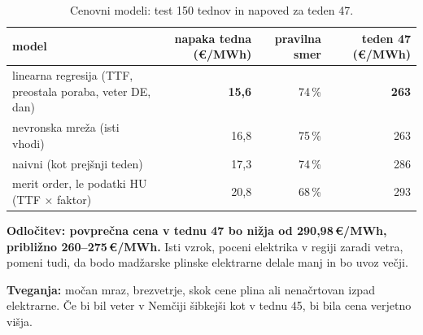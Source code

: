 \documentclass[10pt,a4paper]{article}
\begin{document}
\begin{table}[H]
\centering\footnotesize

\footnotesize\setlength{\tabcolsep}{4pt}
\begin{tabular}{lrrr}
\toprule
model & napaka tedna (€/MWh) & pravilna smer & teden 47 (€/MWh) \\
\midrule
linearna regresija (TTF, preostala poraba, veter DE, dan) & \textbf{15,6} & 74\,\% & \textbf{263} \\
nevronska mreža (isti vhodi) & 16,8 & 75\,\% & 263 \\
naivni (kot prejšnji teden) & 17,3 & 74\,\% & 286 \\
merit order, le podatki HU (TTF × faktor) & 20,8 & 68\,\% & 293 \\
\bottomrule
\end{tabular}
\caption{Cenovni modeli: test 150 tednov in napoved za teden 47.}
\end{table}
\vspace{-8pt}

\textbf{Odločitev: povprečna cena v tednu 47 bo nižja od 290,98\,€/MWh, približno 260–275\,€/MWh.} Isti vzrok,
poceni elektrika v regiji zaradi vetra, pomeni tudi, da bodo madžarske plinske elektrarne delale manj in bo uvoz
večji.

\textbf{Tveganja:} močan mraz, brezvetrje, skok cene plina ali nenačrtovan izpad elektrarne. Če bi bil veter v
Nemčiji šibkejši kot v tednu 45, bi bila cena verjetno višja.
\end{document}
